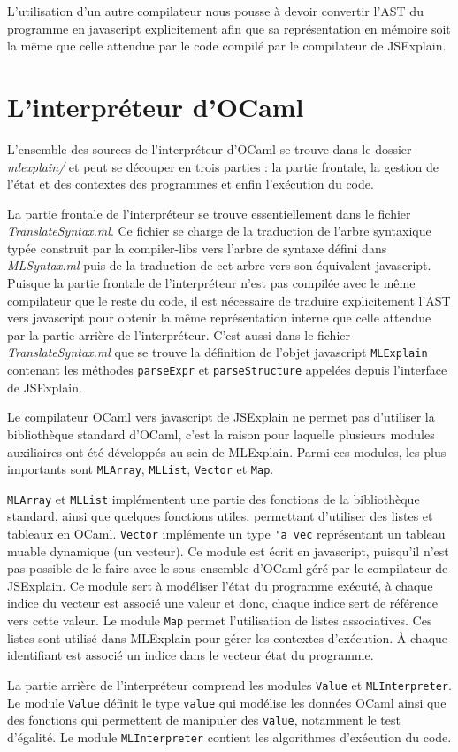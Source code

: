 \documentclass{easychair}
\begin{document}
L'utilisation d'un autre compilateur nous pousse à devoir convertir l'AST du 
programme en javascript explicitement afin que sa représentation en mémoire 
soit la même que celle attendue par le code compilé par le compilateur de 
JSExplain.

\section{L'interpréteur d'OCaml}
L'ensemble des sources de l'interpréteur d'OCaml se trouve dans le dossier 
\emph{mlexplain/} et peut se découper en trois parties : la partie 
frontale, la gestion de l'état et des contextes des programmes et enfin 
l'exécution du code.

La partie frontale de l'interpréteur se trouve essentiellement dans le fichier 
\emph{TranslateSyntax.ml}. Ce fichier se charge de la traduction de 
l'arbre syntaxique typée construit par la compiler-libs vers l'arbre de syntaxe 
défini dans \emph{MLSyntax.ml} puis de la traduction de cet arbre vers son 
équivalent javascript. Puisque la partie frontale de l'interpréteur n'est pas 
compilée avec le même compilateur que le reste du code, il est nécessaire de 
traduire explicitement l'AST vers javascript pour obtenir la même 
représentation interne que celle attendue par la partie arrière de 
l'interpréteur. C'est aussi dans le fichier \emph{TranslateSyntax.ml} que se 
trouve la définition de l'objet javascript \verb|MLExplain| contenant les 
méthodes \verb|parseExpr| et \verb|parseStructure| appelées depuis l'interface 
de JSExplain.

Le compilateur OCaml vers javascript de JSExplain ne permet pas d'utiliser la 
bibliothèque standard d'OCaml, c'est la raison pour laquelle plusieurs modules 
auxiliaires ont été développés au sein de MLExplain. Parmi ces modules, les 
plus importants sont \verb|MLArray|, \verb|MLList|, \verb|Vector| et 
\verb|Map|.

\verb|MLArray| et \verb|MLList| implémentent une partie des fonctions de la 
bibliothèque standard, ainsi que quelques fonctions utiles, permettant 
d'utiliser des listes et tableaux en OCaml. \verb|Vector| implémente un type 
\verb|'a vec| représentant un tableau muable dynamique (un vecteur). Ce module 
est écrit en javascript, puisqu'il n'est pas possible de le faire avec le 
sous-ensemble d'OCaml géré par le compilateur de JSExplain. Ce module sert à 
modéliser l'état du programme exécuté, à chaque indice du vecteur est associé 
une valeur et donc, chaque indice sert de référence vers cette valeur. Le 
module \verb|Map| permet l'utilisation de listes associatives. Ces listes sont 
utilisé dans MLExplain pour gérer les contextes d'exécution. À chaque 
identifiant est associé un indice dans le vecteur état du programme.

La partie arrière de l'interpréteur comprend les modules \verb|Value| et 
\verb|MLInterpreter|. Le module \verb|Value| définit le type \verb|value| qui 
modélise les données OCaml ainsi que des fonctions qui permettent de manipuler 
des \verb|value|, notamment le test d'égalité. Le module \verb|MLInterpreter| 
contient les algorithmes d'exécution du code.


\end{document}
